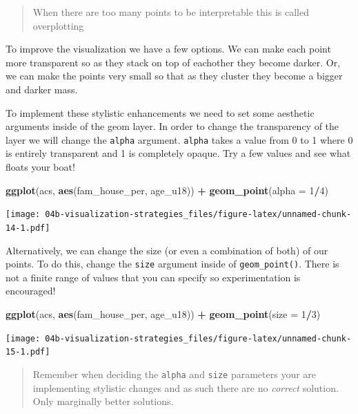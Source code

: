 \documentclass[
]{book}
\newenvironment{Shaded}{\begin{snugshade}}{\end{snugshade}}
\newcommand{\DataTypeTok}[1]{\textcolor[rgb]{0.13,0.29,0.53}{#1}}
\newcommand{\DecValTok}[1]{\textcolor[rgb]{0.00,0.00,0.81}{#1}}
\newcommand{\KeywordTok}[1]{\textcolor[rgb]{0.13,0.29,0.53}{\textbf{#1}}}
\newcommand{\NormalTok}[1]{#1}
\newcommand{\OperatorTok}[1]{\textcolor[rgb]{0.81,0.36,0.00}{\textbf{#1}}}
\newcommand{\StringTok}[1]{\textcolor[rgb]{0.31,0.60,0.02}{#1}}
\begin{document}
\begin{quote}
When there are too many points to be interpretable this is called overplotting
\end{quote}

To improve the visualization we have a few options. We can make each point more transparent so as they stack on top of eachother they become darker. Or, we can make the points very small so that as they cluster they become a bigger and darker mass.

To implement these stylistic enhancements we need to set some aesthetic arguments inside of the geom layer. In order to change the transparency of the layer we will change the \texttt{alpha} argument. \texttt{alpha} takes a value from 0 to 1 where 0 is entirely transparent and 1 is completely opaque. Try a few values and see what floats your boat!

\begin{Shaded}
\begin{Highlighting}[]
\KeywordTok{ggplot}\NormalTok{(acs, }\KeywordTok{aes}\NormalTok{(fam\_house\_per, age\_u18)) }\OperatorTok{+}
\StringTok{  }\KeywordTok{geom\_point}\NormalTok{(}\DataTypeTok{alpha =} \DecValTok{1}\OperatorTok{/}\DecValTok{4}\NormalTok{)}
\end{Highlighting}
\end{Shaded}

\texttt{[image: 04b-visualization-strategies\_files/figure-latex/unnamed-chunk-14-1.pdf]}

Alternatively, we can change the size (or even a combination of both) of our points. To do this, change the \texttt{size} argument inside of \texttt{geom\_point()}. There is not a finite range of values that you can specify so experimentation is encouraged!

\begin{Shaded}
\begin{Highlighting}[]
\KeywordTok{ggplot}\NormalTok{(acs, }\KeywordTok{aes}\NormalTok{(fam\_house\_per, age\_u18)) }\OperatorTok{+}
\StringTok{  }\KeywordTok{geom\_point}\NormalTok{(}\DataTypeTok{size =} \DecValTok{1}\OperatorTok{/}\DecValTok{3}\NormalTok{)}
\end{Highlighting}
\end{Shaded}

\texttt{[image: 04b-visualization-strategies\_files/figure-latex/unnamed-chunk-15-1.pdf]}

\begin{quote}
Remember when deciding the \texttt{alpha} and \texttt{size} parameters your are implementing stylistic changes and as such there are no \emph{correct} solution. Only marginally better solutions.
\end{quote}
\end{document}
